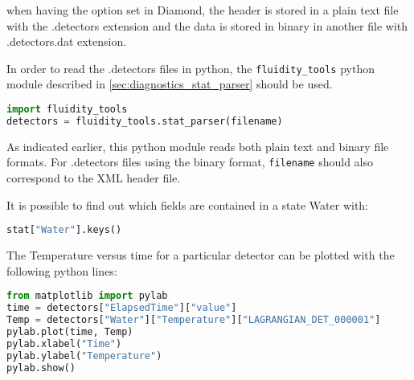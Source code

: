 when having the  option set in Diamond, the header is stored in a plain text file with the .detectors extension and the data is stored in binary in another file with .detectors.dat extension.

In order to read the .detectors files in python, the \lstinline[language = Python]*fluidity_tools* python module described in \ref{sec:diagnostics_stat_parser} should be used.

\begin{lstlisting}[language = Python]
import fluidity_tools
detectors = fluidity_tools.stat_parser(filename)
\end{lstlisting}

As indicated earlier, this python module reads both
plain text and binary file formats. For .detectors files using the binary
format, \lstinline[language = Python]*filename* should also correspond to the XML header file.

It is possible to find out which fields are contained in a state Water with:

\begin{lstlisting}[language=Python]
stat["Water"].keys()
\end{lstlisting}

The Temperature versus time for a particular detector can be plotted with the following python lines:

\begin{lstlisting}[language=Python]
from matplotlib import pylab
time = detectors["ElapsedTime"]["value"]
Temp = detectors["Water"]["Temperature"]["LAGRANGIAN_DET_000001"]
pylab.plot(time, Temp)
pylab.xlabel("Time")
pylab.ylabel("Temperature")
pylab.show()
\end{lstlisting}

